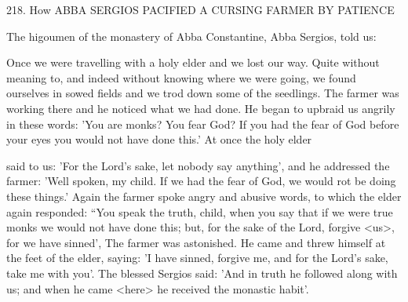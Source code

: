 218. How ABBA SERGIOS PACIFIED A CURSING
FARMER BY PATIENCE

The higoumen of the monastery of Abba Constantine, Abba
Sergios, told us:

Once we were travelling with a holy elder and we lost our way.
Quite without meaning to, and indeed without knowing where we
were going, we found ourselves in sowed fields and we trod down
some of the seedlings. The farmer was working there and he noticed
what we had done. He began to upbraid us angrily in these words:
'You are monks? You fear God? If you had the fear of God before
your eyes you would not have done this.' At once the holy elder

said to us: 'For the Lord's sake, let nobody say anything', and he
addressed the farmer: 'Well spoken, my child. If we had the fear of
God, we would rot be doing these things.' Again the farmer spoke
angry and abusive words, to which the elder again responded: “You
speak the truth, child, when you say that if we were true monks we
would not have done this; but, for the sake of the Lord, forgive
<us>, for we have sinned', The farmer was astonished. He came and
threw himself at the feet of the elder, saying: 'I have sinned, forgive
me, and for the Lord's sake, take me with you'. The blessed Sergios
said: 'And in truth he followed along with us; and when he came
<here> he received the monastic habit'.

